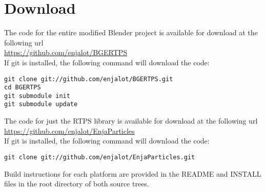
\section{Download}
The code for the entire modified Blender project is available for download at the following url \\
\url{https://github.com/enjalot/BGERTPS} \\
If git\cite{Git} is installed, the following command will
download the code: 
\begin{verbatim}
git clone git://github.com/enjalot/BGERTPS.git
cd BGERTPS
git submodule init
git submodule update
\end{verbatim} 

The code for just the RTPS library is available for download at the following url \\ 
\url{https://github.com/enjalot/EnjaParticles} \\
If git\cite{Git} is installed, the following command will
download the code: 
\begin{verbatim}
git clone git://github.com/enjalot/EnjaParticles.git
\end{verbatim} 

Build instructions for each platform are provided in the README and INSTALL
files in the root directory of both source trees.


